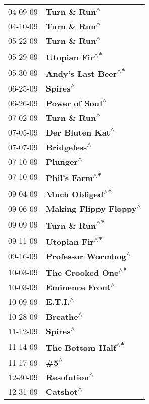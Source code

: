 \begin{supertabular}{p{0.25\columnwidth}p{0.75\columnwidth}}
 04-09-09 &                 \textbf{Turn \& Run\textsuperscript{$\wedge$}} \\
 04-10-09 &                 \textbf{Turn \& Run\textsuperscript{$\wedge$}} \\
 05-22-09 &                 \textbf{Turn \& Run\textsuperscript{$\wedge$}} \\
 05-29-09 &                \textbf{Utopian Fir\textsuperscript{$\wedge$*}} \\
 05-30-09 &           \textbf{Andy's Last Beer\textsuperscript{$\wedge$*}} \\
 06-25-09 &                      \textbf{Spires\textsuperscript{$\wedge$}} \\
 06-26-09 &               \textbf{Power of Soul\textsuperscript{$\wedge$}} \\
 07-02-09 &                 \textbf{Turn \& Run\textsuperscript{$\wedge$}} \\
 07-05-09 &              \textbf{Der Bluten Kat\textsuperscript{$\wedge$}} \\
 07-07-09 &                  \textbf{Bridgeless\textsuperscript{$\wedge$}} \\
 07-10-09 &                     \textbf{Plunger\textsuperscript{$\wedge$}} \\
 07-10-09 &                \textbf{Phil's Farm\textsuperscript{$\wedge$*}} \\
 09-04-09 &               \textbf{Much Obliged\textsuperscript{$\wedge$*}} \\
 09-06-09 &        \textbf{Making Flippy Floppy\textsuperscript{$\wedge$}} \\
 09-09-09 &                \textbf{Turn \& Run\textsuperscript{$\wedge$*}} \\
 09-11-09 &                \textbf{Utopian Fir\textsuperscript{$\wedge$*}} \\
 09-16-09 &           \textbf{Professor Wormbog\textsuperscript{$\wedge$}} \\
 10-03-09 &            \textbf{The Crooked One\textsuperscript{$\wedge$*}} \\
 10-03-09 &              \textbf{Eminence Front\textsuperscript{$\wedge$}} \\
 10-09-09 &                      \textbf{E.T.I.\textsuperscript{$\wedge$}} \\
 10-28-09 &                     \textbf{Breathe\textsuperscript{$\wedge$}} \\
 11-12-09 &                      \textbf{Spires\textsuperscript{$\wedge$}} \\
 11-14-09 &            \textbf{The Bottom Half\textsuperscript{$\wedge$*}} \\
 11-17-09 &                         \textbf{\#5\textsuperscript{$\wedge$}} \\
 12-30-09 &                  \textbf{Resolution\textsuperscript{$\wedge$}} \\
 12-31-09 &                     \textbf{Catshot\textsuperscript{$\wedge$}} \\
\end{supertabular}
